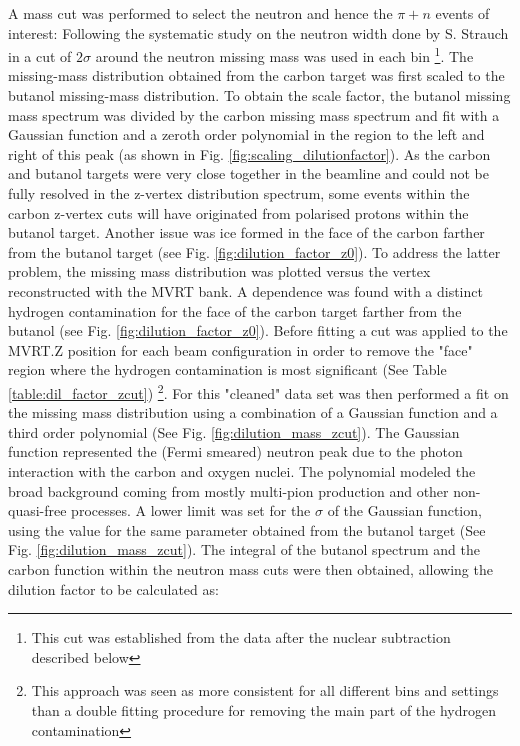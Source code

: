 A mass cut was performed to select the neutron and hence the $\pi + n$ events of interest: Following the systematic study on the neutron width done by S. Strauch in \cite{Strauch_2014} a cut of $2 \sigma$ around the neutron missing mass was used in each bin \footnote{This cut was established from the data after the nuclear subtraction described below}. The missing-mass distribution obtained from the carbon target was first scaled to the butanol missing-mass distribution. To obtain the scale factor, the butanol missing mass spectrum was divided by the carbon missing mass spectrum and fit with a Gaussian function and a zeroth order polynomial in the region to the left and right of this peak (as shown in Fig. \ref{fig:scaling_dilutionfactor}). 
As the carbon and butanol targets were very close together in the beamline and could not be fully resolved in the z-vertex distribution spectrum, some events within the carbon z-vertex cuts will have originated from polarised protons within the butanol target. Another issue was ice formed in the face of the carbon farther from the butanol target (see Fig. \ref{fig:dilution_factor_z0}). To address the latter problem, the missing mass distribution was plotted versus the vertex reconstructed with the MVRT bank. A dependence was found with a distinct hydrogen contamination for the face of the carbon target farther from the butanol (see Fig. \ref{fig:dilution_factor_z0}). Before fitting a cut was applied to the MVRT.Z position for each beam configuration in order to remove the "face" region where the hydrogen contamination is most significant (See Table \ref{table:dil_factor_zcut}) \footnote{This approach was seen as more consistent for all different bins and settings than a double fitting procedure for removing the main part of the hydrogen contamination}. For this "cleaned" data set was then performed a fit on the missing mass distribution using a combination of a Gaussian function and a third order polynomial (See Fig. \ref{fig:dilution_mass_zcut}). The Gaussian function represented the (Fermi smeared) neutron peak due to the photon interaction with the carbon and oxygen nuclei. The polynomial modeled the broad background coming from mostly multi-pion production and other non-quasi-free processes. A lower limit was set for the $\sigma$ of the Gaussian function, using the value for the same parameter obtained from the butanol target (See Fig. \ref{fig:dilution_mass_zcut}). The integral of the butanol spectrum and the carbon function within the neutron mass cuts were then obtained, allowing the dilution factor to be calculated as:
